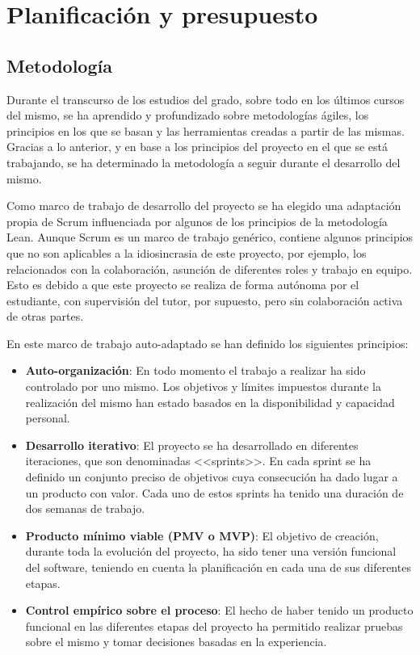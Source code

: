 \chapter{Planificación y presupuesto}
\section{Metodología}
Durante el transcurso de los estudios del grado, sobre todo en los últimos cursos del mismo, se ha aprendido y profundizado sobre metodologías ágiles, los principios en los que se basan y las herramientas creadas a partir de las mismas. Gracias a lo anterior, y en base a los principios del proyecto en el que se está trabajando, se ha determinado la metodología a seguir durante el desarrollo del mismo.

Como marco de trabajo de desarrollo del proyecto se ha elegido una adaptación propia de Scrum influenciada por algunos de los principios de la metodología Lean. Aunque Scrum es un marco de trabajo genérico, contiene algunos principios que no son aplicables a la idiosincrasia de este proyecto, por ejemplo, los relacionados con la colaboración, asunción de diferentes roles y trabajo en equipo. Esto es debido a que este proyecto se realiza de forma autónoma por el estudiante, con supervisión del tutor, por supuesto, pero sin colaboración activa de otras partes.

En este marco de trabajo auto-adaptado se han definido los siguientes principios:
\begin{itemize}
    \item{\textbf{Auto-organización}}: En todo momento el trabajo a realizar ha sido controlado por uno mismo. Los objetivos y límites impuestos durante la realización del mismo han estado basados en la disponibilidad y capacidad personal.
    \item \textbf{Desarrollo iterativo}: El proyecto se ha desarrollado en diferentes iteraciones, que son denominadas <<sprints>>. En cada sprint se ha definido un conjunto preciso de objetivos cuya consecución ha dado lugar a un producto con valor. Cada uno de estos sprints ha tenido una duración de dos semanas de trabajo.
    \item \textbf{Producto mínimo viable (PMV o MVP)}: El objetivo de creación, durante toda la evolución del proyecto, ha sido tener una versión funcional del software, teniendo en cuenta la planificación en cada una de sus diferentes etapas.
    \item \textbf{Control empírico sobre el proceso}: El hecho de haber tenido un producto funcional en las diferentes etapas del proyecto ha permitido realizar pruebas sobre el mismo y tomar decisiones basadas en la experiencia.
\end{itemize}

